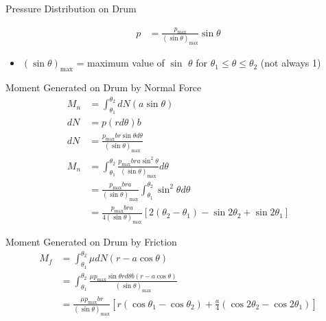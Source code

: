 \documentclass[10pt, svgnames]{beamer}
\begin{document}
\begin{frame}[label={sec:org2fe167f}]{Pressure Distribution on Drum}
\begin{align*}
    p &= \frac{p_{\max}}{(\sin \theta)_{\max}} \sin \theta
\end{align*}

\begin{itemize}
\item \((\sin \theta)_{\max}\) = maximum value of \(\sin\) \(\theta\) for \(\theta_{1} \leqslant \theta \leqslant \theta_{2}\) (not always 1)
\end{itemize}
\end{frame}

\begin{frame}[label={sec:org7fb114f}]{Moment Generated on Drum by Normal Force}
\begin{align*}
    M_n &= \int_{\theta_1}^{\theta_2} dN (a \sin \theta) \\
    dN &= p (r d\theta) b \\
    dN &= \frac{p_{\max} br \sin \theta d\theta}{(\sin \theta)_{\max}} \\
    M_n &= \int_{\theta_1}^{\theta_2} \frac{p_{\max} bra \sin^2 \theta}{(\sin \theta)_{\max}} d\theta \\
        &= \frac{p_{\max} bra}{(\sin \theta)_{\max}} \int_{\theta_1}^{\theta_2} \sin^2 \theta d\theta \\
        &= \frac{p_{\max} bra}{4(\sin \theta)_{\max}} [2(\theta_2 - \theta_1) - \sin 2\theta_2 + \sin 2\theta_1]
\end{align*}
\end{frame}

\begin{frame}[label={sec:org361ceb6}]{Moment Generated on Drum by Friction}
\begin{align*}
    M_f &= \int_{\theta_1}^{\theta_2} \mu dN (r - a \cos \theta) \\
        &= \int_{\theta_1}^{\theta_2} \frac{\mu p_{\max} \sin \theta r d\theta b (r - a \cos \theta)}{(\sin \theta)_{\max}} \\
        &= \frac{\mu p_{\max} br}{(\sin \theta)_{\max}} \left[ r( \cos \theta_1 - \cos \theta_2) + \frac{a}{4}(\cos 2\theta_2 - \cos 2\theta_1) \right]
\end{align*}
\end{frame}
\end{document}
